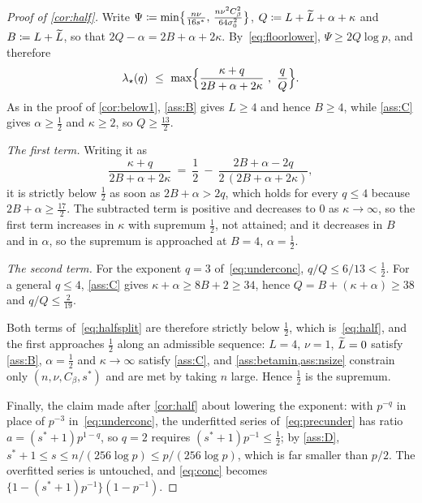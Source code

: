 \begin{proof}[Proof of \cref{cor:half}]
    Write $\Psi\coloneq\min\bigl\{\tfrac{n\nu}{16s^{\ast}},\, \tfrac{n\nu^{2}C_\beta^{2}}{64\sigma_0^{2}}\bigr\}$, $Q\coloneq L+\widetilde{L}+\alpha+\kappa$ and
    $B\coloneq L+\widetilde{L}$, so that $2Q-\alpha=2B+\alpha+2\kappa$.
    By~\eqref{eq:floorlower}, $\Psi\geq2Q\log p$, and therefore
    \begin{equation}
        \label{eq:halfsplit}
        \lambda_\star(q)\ \leq\
        \max\Bigl\{\frac{\kappa+q}{2B+\alpha+2\kappa}\ ,\
        \frac{q}{Q}\Bigr\} .
    \end{equation}
    As in the proof of \cref{cor:below1}, \cref{ass:B} gives $L\geq4$ and
    hence $B\geq4$, while \cref{ass:C} gives $\alpha\geq\tfrac12$ and
    $\kappa\geq2$, so $Q\geq\tfrac{13}2$.

    \emph{The first term.} Writing it as
    \begin{equation*}
        \frac{\kappa+q}{2B+\alpha+2\kappa}
        \ =\ \frac12\ -\ \frac{2B+\alpha-2q}{2\,(2B+\alpha+2\kappa)} ,
    \end{equation*}
    it is strictly below $\tfrac12$ as soon as $2B+\alpha>2q$, which holds
    for every $q\leq4$ because $2B+\alpha\geq\tfrac{17}2$. The subtracted
    term is positive and decreases to $0$ as $\kappa\to\infty$, so the first
    term increases in $\kappa$ with supremum $\tfrac12$, not attained; and it
    decreases in $B$ and in $\alpha$, so the supremum is approached at
    $B=4$, $\alpha=\tfrac12$.

    \emph{The second term.} For the exponent $q=3$ of~\eqref{eq:underconc},
    $q/Q\leq6/13<\tfrac12$. For a general $q\leq4$, \cref{ass:C} gives
    $\kappa+\alpha\geq8B+2\geq34$, hence $Q=B+(\kappa+\alpha)\geq38$ and
    $q/Q\leq\tfrac2{19}$.

    Both terms of~\eqref{eq:halfsplit} are therefore strictly below
    $\tfrac12$, which is~\eqref{eq:half}, and the first approaches $\tfrac12$
    along an admissible sequence: $L=4$, $\nu=1$, $\widetilde{L}=0$ satisfy
    \cref{ass:B}, $\alpha=\tfrac12$ and $\kappa\to\infty$ satisfy
    \cref{ass:C}, and \cref{ass:betamin,ass:nsize} constrain only
    $(n,\nu,C_\beta,s^{\ast})$ and are met by taking $n$ large. Hence
    $\tfrac12$ is the supremum.

    Finally, the claim made after \cref{cor:half} about lowering the
    exponent: with $p^{-q}$ in place of $p^{-3}$
    in~\eqref{eq:underconc}, the underfitted series of~\eqref{eq:precunder}
    has ratio $a=(s^{\ast}+1)p^{1-q}$, so $q=2$ requires
    $(s^{\ast}+1)p^{-1}\leq\tfrac12$; by \cref{ass:D},
    $s^{\ast}+1\leq s\leq n/(256\log p)\leq p/(256\log p)$, which is far
    smaller than $p/2$. The overfitted series is untouched, and
    \eqref{eq:conc} becomes $\{1-(s^{\ast}+1)p^{-1}\}(1-p^{-1})$.
\end{proof}

